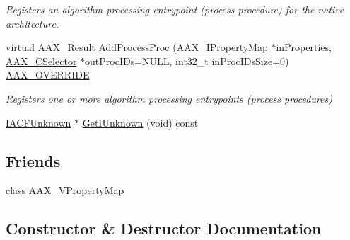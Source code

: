 \begin{DoxyCompactItemize}
\begin{DoxyCompactList}\small\item\em Registers an algorithm processing entrypoint (process procedure) for the native architecture. \end{DoxyCompactList}\item 
virtual \hyperlink{a00149_a4d8f69a697df7f70c3a8e9b8ee130d2f}{A\+A\+X\+\_\+\+Result} \hyperlink{a00131_a93702a420bd6d61187802ac09b223c03}{Add\+Process\+Proc} (\hyperlink{a00112}{A\+A\+X\+\_\+\+I\+Property\+Map} $\ast$in\+Properties, \hyperlink{a00149_aeaf9b387f902c50a8360ff423f4a1f23}{A\+A\+X\+\_\+\+C\+Selector} $\ast$out\+Proc\+I\+Ds=N\+U\+L\+L, int32\+\_\+t in\+Proc\+I\+Ds\+Size=0) \hyperlink{a00149_ac2f24a5172689ae684344abdcce55463}{A\+A\+X\+\_\+\+O\+V\+E\+R\+R\+I\+D\+E}
\begin{DoxyCompactList}\small\item\em Registers one or more algorithm processing entrypoints (process procedures) \end{DoxyCompactList}\item 
\hyperlink{a00146}{I\+A\+C\+F\+Unknown} $\ast$ \hyperlink{a00131_ad9d93a4550263cc997798239ba9a799d}{Get\+I\+Unknown} (void) const 
\end{DoxyCompactItemize}
\subsection*{Friends}
\begin{DoxyCompactItemize}
\item 
class \hyperlink{a00131_a4e23888818817a675e86dd4e71bd1ab1}{A\+A\+X\+\_\+\+V\+Property\+Map}
\end{DoxyCompactItemize}


\subsection{Constructor \& Destructor Documentation}
\hypertarget{a00131_ac7afc2d0da1ba680cfe5316facfff038}{}
